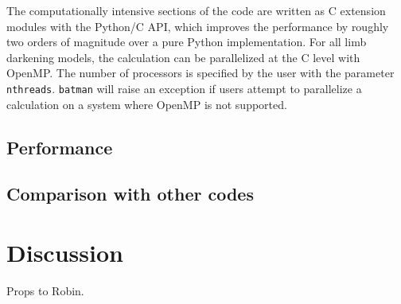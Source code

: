 \documentclass[12pt,preprint]{aastex}
\begin{document}
The computationally intensive sections of the code are written as C extension modules with the Python/C API, which improves the performance by roughly two orders of magnitude over a pure Python implementation.  For all limb darkening models, the calculation can be parallelized at the C level with OpenMP. The number of processors is specified by the user with the parameter \texttt{nthreads}.  \texttt{batman} will raise an exception if users attempt to parallelize a calculation on a system where OpenMP is not supported.



\subsection{Performance}
\subsection{Comparison with other codes}

\section{Discussion}

\acknowledgments
Props to Robin.



\end{document}
